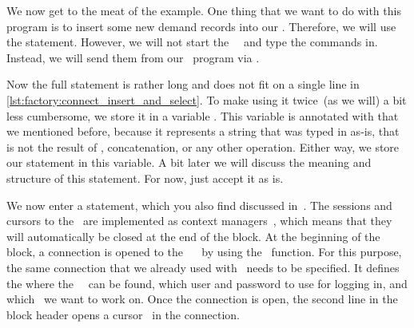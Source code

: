 We now get to the meat of the example.
One thing that we want to do with this program is to insert some new demand records into our \db.
Therefore, we will use the  statement.
However, we will not start the \psql\ \client\ and type the commands in.
Instead, we will send them from our \python\ program via \psycopg.

Now the full  statement is rather long and does not fit on a single line in \cref{lst:factory:connect_insert_and_select}.
To make using it twice~(as we will) a bit less cumbersome, we store it in a variable .
This variable is annotated with   that we mentioned before, because it represents a string that was typed in as-is, that is not the result of , concatenation, or any other operation.
Either way, we store our statement in this variable.
A bit later we will discuss the meaning and structure of this statement.
For now, just accept it as is.

We now enter a  statement, which you also find discussed in~\cite{programmingWithPython}.
The sessions and cursors to the \db\ are implemented as context managers~\cite{PSF2024WSCM}, which means that they will automatically be closed at the end of the  block.
At the beginning of the block, a connection  is opened to the \postgresql\ \dbms~\cite{VDGE2022PPDAFP:CC1} by using the ~function.
For this purpose, the same connection  that we already used with \psql\ needs to be specified.
It defines the where the \postgresql\ \server\ can be found, which user and password to use for logging in, and which \db\ we want to work on.
Once the connection is open, the second line in the  block header opens a cursor~\cite{VDGE2022PPDAFP:CC2} in the connection.

